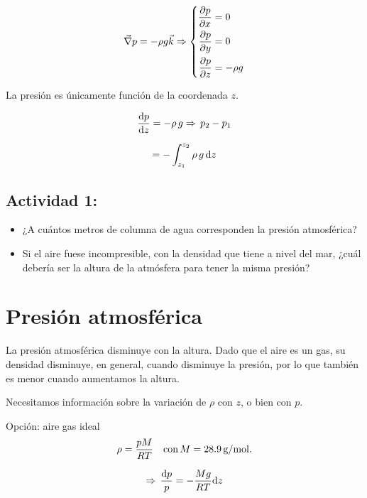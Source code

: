 \[
\vec{\nabla}p=-\rho g\vec{k}\Rightarrow\left\{ \begin{aligned}\frac{\partial p}{\partial x} & =0\\
\frac{\partial p}{\partial y} & =0\\
\frac{\partial p}{\partial z} & =-\rho g
\end{aligned}
\right.
\]
%

La presión es únicamente función de la coordenada $z$.

\[
\frac{\textrm{d} p}{\textrm{d} z}=-\rho\,g\Rightarrow\,p_{2}-p_{1}
\]

\[
=-\int_{z_{1}}^{z_{2}}\rho\,g\,\text{d} z
\]
%

\subsection*{Actividad 1:}
\noindent\begin{minipage}[t]{1\columnwidth}%
\begin{itemize}
\item ¿A cuántos metros de columna de agua corresponden la presión atmosférica?
\item Si el aire fuese incompresible, con la densidad que tiene a nivel
del mar, ¿cuál debería ser la altura de la atmósfera para tener la
misma presión?
\end{itemize}
%
\end{minipage}

\section{Presión atmosférica}

La presión atmosférica disminuye con la altura. Dado que el aire es
un gas, su densidad disminuye, en general, cuando disminuye la presión,
por lo que también es menor cuando aumentamos la altura.

Necesitamos información sobre la variación de $\rho$ con $z$, o
bien con $p$.

Opción: aire gas ideal 
\[
\rho=\frac{pM}{RT}\quad\textnormal{con}\,M=28.9\,\textnormal{g/mol}.
\]
 
\begin{equation}
\Rightarrow\,\frac{\text{d} p}{p}=-\frac{Mg}{RT}\text{d} z\label{eq:general}
\end{equation}



